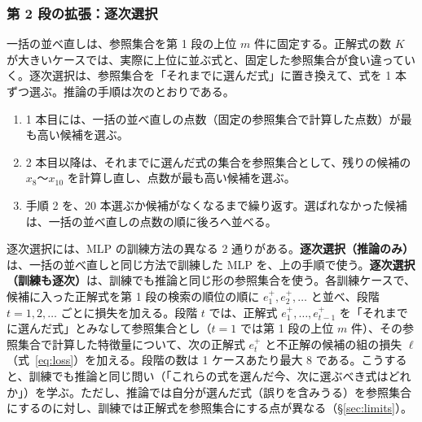 \documentclass[a4j,dvipdfmx,11pt]{jresume}
\begin{document}
\subsubsection{第 2 段の拡張：逐次選択}\label{sec:seqmethod}
一括の並べ直しは、参照集合を第 1 段の上位 $m$ 件に固定する。正解式の数 $K$ が大きいケースでは、実際に上位に並ぶ式と、固定した参照集合が食い違っていく。逐次選択は、参照集合を「それまでに選んだ式」に置き換えて、式を 1 本ずつ選ぶ。推論の手順は次のとおりである。
\begin{enumerate}[leftmargin=2.2em]
  \item 1 本目には、一括の並べ直しの点数（固定の参照集合で計算した点数）が最も高い候補を選ぶ。
  \item 2 本目以降は、それまでに選んだ式の集合を参照集合として、残りの候補の $x_8$〜$x_{10}$ を計算し直し、点数が最も高い候補を選ぶ。
  \item 手順 2 を、20 本選ぶか候補がなくなるまで繰り返す。選ばれなかった候補は、一括の並べ直しの点数の順に後ろへ並べる。
\end{enumerate}
逐次選択には、MLP の訓練方法の異なる 2 通りがある。\textbf{逐次選択（推論のみ）}は、一括の並べ直しと同じ方法で訓練した MLP を、上の手順で使う。\textbf{逐次選択（訓練も逐次）}は、訓練でも推論と同じ形の参照集合を使う。各訓練ケースで、候補に入った正解式を第 1 段の検索の順位の順に $e^+_1, e^+_2, \dots$ と並べ、段階 $t = 1, 2, \dots$ ごとに損失を加える。段階 $t$ では、正解式 $e^+_1, \dots, e^+_{t-1}$ を「それまでに選んだ式」とみなして参照集合とし（$t = 1$ では第 1 段の上位 $m$ 件）、その参照集合で計算した特徴量について、次の正解式 $e^+_t$ と不正解の候補の組の損失 $\ell$（式~\eqref{eq:loss}）を加える。段階の数は 1 ケースあたり最大 8 である。こうすると、訓練でも推論と同じ問い（「これらの式を選んだ今、次に選ぶべき式はどれか」）を学ぶ。ただし、推論では自分が選んだ式（誤りを含みうる）を参照集合にするのに対し、訓練では正解式を参照集合にする点が異なる（\S\ref{sec:limits}）。
\end{document}

